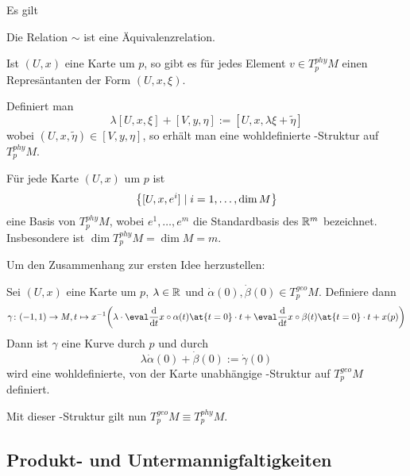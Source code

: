 \begin{proposition}
  Es gilt
  \begin{statements}
  \item Die Relation $\sim$ ist eine Äquivalenzrelation.
  \item Ist $(U,x)$ eine Karte um $p$, so gibt es für jedes Element
    $v\in T^{phy}_pM$ einen Represäntanten der Form $(U,x,\xi)$.
  \item Definiert man
    \begin{equation*}
      \lambda[U,x,\xi] + [V,y,\eta] := [U,x,\lambda\xi + \tilde\eta]
    \end{equation*}
    wobei $(U,x,\tilde\eta) \in [V,y,\eta]$, so erhält man eine
    wohldefinierte \VR-Struktur auf $T_p^{phy}M$.
  \item Für jede Karte $(U,x)$ um $p$ ist
    \begin{equation*}
      \left\lbrace [U,x,e^i] \mid i=1,\dots,\dim M \right\rbrace
    \end{equation*}
    eine Basis von $T^{phy}_pM$, wobei $e^1,\dots,e^m$ die
    Standardbasis des $\mathbb{R}^m$ bezeichnet. Insbesondere ist $\dim
    T^{phy}_pM = \dim M = m$.
  \end{statements}
\end{proposition}

Um den Zusammenhang zur ersten Idee herzustellen:
\begin{proposition}
  Sei $(U,x)$ eine Karte um $p$, $\lambda\in \mathbb{R}$ und $\dot\alpha(0),\dot\beta(0)\in
  T^{geo}_pM$. Definiere dann
  \begin{equation*}
    \gamma \colon (-1,1) \to M, t\mapsto x^{-1}\bigg( 
    \lambda\cdot \eval\ddt x\circ\alpha(t)\at{t=0}\cdot t + \eval\ddt
    x\circ\beta(t)\at{t=0} \cdot t + x(p)\bigg)
  \end{equation*}
  Dann ist $\gamma$ eine Kurve durch $p$ und durch
  \begin{equation*}
    \lambda \dot\alpha(0) + \dot\beta(0) := \dot\gamma(0)
  \end{equation*}
  wird eine wohldefinierte, von der Karte unabhängige \VR-Struktur auf
  $T^{geo}_pM$ definiert.

  Mit dieser \VR-Struktur gilt nun $T^{geo}_pM \equiv T^{phy}_pM$.
\end{proposition}



\subsection{Produkt- und Untermannigfaltigkeiten}
\label{sec:prumfk}



